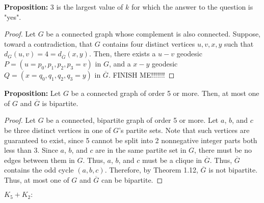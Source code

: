 \documentclass[12pt]{article}
\begin{document}
\medskip
{\bf Proposition:} 3 is the largest value of $k$ for which the answer to the question is "yes".
\begin{proof}
    Let $G$ be a connected graph whose complement is also connected.
    Suppose, toward a contradiction, that $G$ contains four distinct vertices $u,v,x,y$ such that $d_G(u,v) = 4 = d_{\overline{G}}(x,y)$.
    Then, there exists a $u-v$ geodesic $P = (u = p_0, p_1, p_2, p_3 = v)$ in $G$, and a $x-y$ geodesic $Q = (x = q_0, q_1, q_2, q_3 = y)$ in $\overline G$.
    FINISH ME!!!!!!!
\end{proof}

\bigskip
{}

{\bf Proposition:} Let $G$ be a connected graph of order 5 or more. Then, at most one of $G$ and $\overline G$ is bipartite.
\begin{proof}
    Let $G$ be a connected, bipartite graph of order 5 or more.
    Let $a$, $b$, and $c$ be three distinct vertices in one of $G$'s partite sets.
    Note that such vertices are guaranteed to exist, since 5 cannot be split into 2 nonnegative integer parts both less than 3.
    Since $a$, $b$, and $c$ are in the same partite set in $G$, there must be no edges between them in $G$.
    Thus, $a$, $b$, and $c$ must be a clique in $\overline G$.
    Thus, $\overline G$ contains the odd cycle $(a,b,c)$.
    Therefore, by Theorem 1.12, $\overline G$ is not bipartite.
    Thus, at most one of $G$ and $\overline G$ can be bipartite.
\end{proof}

\bigskip
{}

 $K_5 + K_2:$
\end{document}

